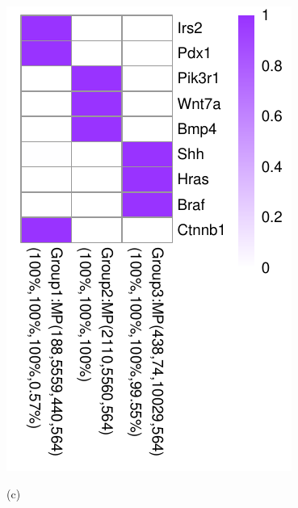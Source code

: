 \documentclass{bmcart}
\begin{document}
\begin{figure}[!h]
  \begin{minipage}{.38\linewidth}
   \includegraphics[width=\linewidth]{DrawPictures/v3.pdf}
    \centerline{(c)}
  \end{minipage}
  \hfil
  \begin{minipage}{.38\linewidth}

\end{minipage}
\end{figure}
\end{document}
